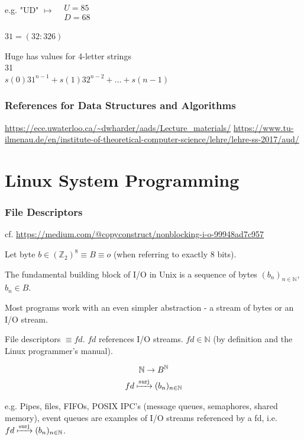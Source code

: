 \documentclass[10pt]{amsart}
\begin{document}
e.g. "UD" $\mapsto \begin{aligned} & \quad \\
	& U = 85 \\
	& D = 68 \end{aligned}$ 

$31 = (32 : 326)$ 

Huge has values for 4-letter strings \\
31 \\
$s(0) 31^{n-1} + s(1) 32^{n-2} + \dots + s(n-1)$

\section{References for Data Structures and Algorithms}

\url{https://ece.uwaterloo.ca/~dwharder/aads/Lecture_materials/}
\url{https://www.tu-ilmenau.de/en/institute-of-theoretical-computer-science/lehre/lehre-ss-2017/aud/}



\part{Linux System Programming}

\section{File Descriptors}

cf. \url{https://medium.com/@copyconstruct/nonblocking-i-o-99948ad7c957}

Let byte $b \in (\mathbb{Z}_2)^8 \equiv B \equiv o$ (when referring to exactly 8 bits).

The fundamental building block of I/O in Unix is a sequence of bytes $(b_n)_{n\in \mathbb{N}}$, $b_n \in B$. 

Most programs work with an even simpler abstraction - a stream of bytes or an I/O stream.

File descriptors $\equiv fd$. $fd$ references I/O streams.  $fd \in \mathbb{N}$ (by definition and the Linux programmer's manual).

\[
\begin{gathered}
\mathbb{N} \to B^{\mathbb{N}} \\
fd \xmapsto{\text{surj}} (b_n)_{n \in \mathbb{N}}
\end{gathered}
\]

e.g. Pipes, files, FIFOs, POSIX IPC's (message queues, semaphores, shared memory), event queues are examples of I/O streams referenced by a fd, i.e. $fd \xmapsto{\text{surj}} (b_n)_{n \in \mathbb{N}}$.
\end{document}
